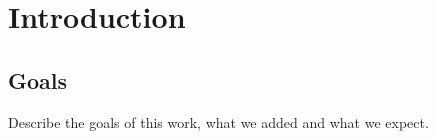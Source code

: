 \chapter{Introduction}

\section{Goals}
Describe the goals of this work, what we added and what we expect.
